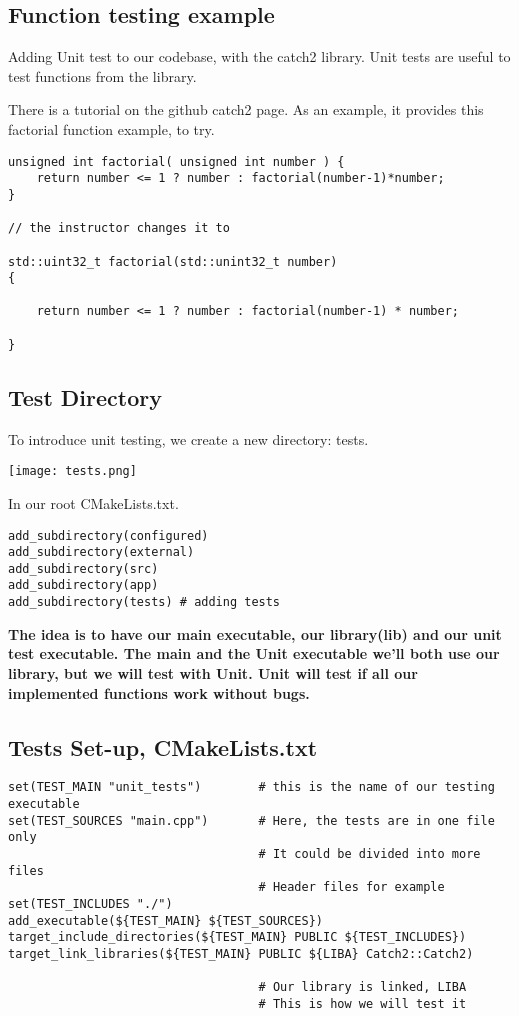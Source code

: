 \subsection{Function testing example}

Adding Unit test to our codebase, with the catch2 library. Unit tests are useful to test functions from the library.

There is a tutorial on the github catch2 page. As an example, it provides this factorial function example, to try.


\begin{verbatim}
unsigned int factorial( unsigned int number ) {
    return number <= 1 ? number : factorial(number-1)*number;
}

// the instructor changes it to

std::uint32_t factorial(std::unint32_t number)
{

    return number <= 1 ? number : factorial(number-1) * number;

}
\end{verbatim}


\subsection{Test Directory}

To introduce unit testing, we create a new directory: tests.

\begin{center}
    \texttt{[image: tests.png]}
\end{center}

In our root CMakeLists.txt.  

\begin{verbatim}
add_subdirectory(configured)
add_subdirectory(external)
add_subdirectory(src)
add_subdirectory(app)
add_subdirectory(tests) # adding tests
\end{verbatim}

\textbf{The idea is to have our main executable, our library(lib) and our unit test executable. The main and the Unit
executable we'll both use our library, but we will test with Unit. Unit will test if all our implemented functions work without bugs.}


\subsection{Tests Set-up, CMakeLists.txt}

\begin{verbatim}
set(TEST_MAIN "unit_tests")        # this is the name of our testing executable
set(TEST_SOURCES "main.cpp")       # Here, the tests are in one file only
                                   # It could be divided into more files
                                   # Header files for example
set(TEST_INCLUDES "./")
add_executable(${TEST_MAIN} ${TEST_SOURCES})
target_include_directories(${TEST_MAIN} PUBLIC ${TEST_INCLUDES})
target_link_libraries(${TEST_MAIN} PUBLIC ${LIBA} Catch2::Catch2)

                                   # Our library is linked, LIBA
                                   # This is how we will test it
\end{verbatim}


